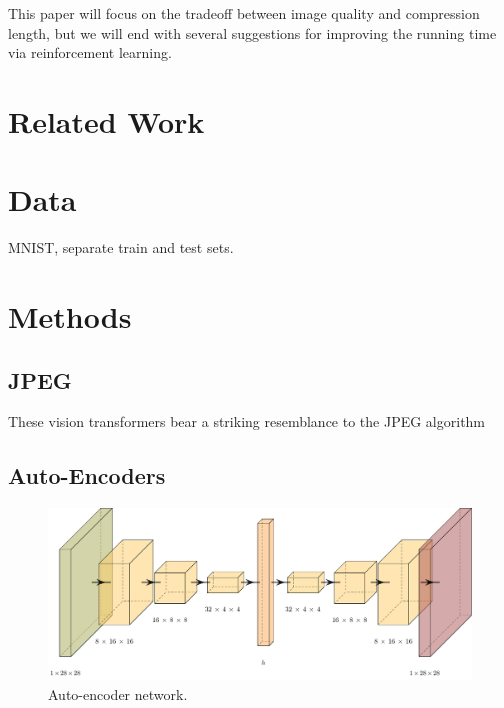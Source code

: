 \documentclass[11pt]{article}
\begin{document}
This paper will focus on the tradeoff between image quality and compression length, but we will end with several suggestions for improving the running time via reinforcement learning.


\section{Related Work}

\section{Data}

MNIST, separate train and test sets.

\section{Methods}

\subsection{JPEG}\label{sec:jpeg}

These vision transformers bear a striking resemblance to the JPEG algorithm

\subsection{Auto-Encoders}

\begin{figure}
  \centering
  \includegraphics[width=1.5\columnwidth]{diagrams/auto.pdf}
  \caption{Auto-encoder network.}
  \label{fig:auto}
\end{figure}
\end{document}
